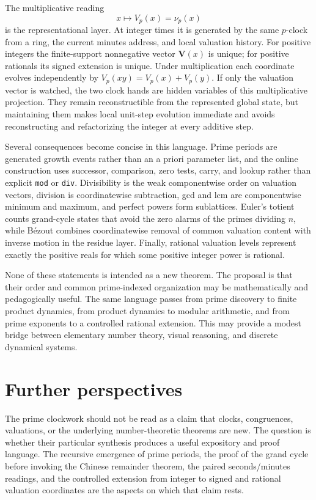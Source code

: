 \documentclass[11pt,a4paper]{article}
\theoremstyle{clockplain}
\theoremstyle{definition}
\theoremstyle{remark}
\newcommand{\V}{\mathbf V}
\begin{document}
The multiplicative reading
\[
x\longmapsto V_p(x)=\nu_p(x)
\]
is the representational layer. At integer times it is generated by the same $p$-clock from a ring, the current minutes address, and local valuation history. For positive integers the finite-support nonnegative vector $\V(x)$ is unique; for positive rationals its signed extension is unique. Under multiplication each coordinate evolves independently by $V_p(xy)=V_p(x)+V_p(y)$. If only the valuation vector is watched, the two clock hands are hidden variables of this multiplicative projection. They remain reconstructible from the represented global state, but maintaining them makes local unit-step evolution immediate and avoids reconstructing and refactorizing the integer at every additive step.

Several consequences become concise in this language. Prime periods are generated growth events rather than an a priori parameter list, and the online construction uses successor, comparison, zero tests, carry, and lookup rather than explicit \texttt{mod} or \texttt{div}. Divisibility is the weak componentwise order on valuation vectors, division is coordinatewise subtraction, gcd and lcm are componentwise minimum and maximum, and perfect powers form sublattices. Euler's totient counts grand-cycle states that avoid the zero alarms of the primes dividing $n$, while B\'ezout combines coordinatewise removal of common valuation content with inverse motion in the residue layer. Finally, rational valuation levels represent exactly the positive reals for which some positive integer power is rational.

None of these statements is intended as a new theorem. The proposal is that their order and common prime-indexed organization may be mathematically and pedagogically useful. The same language passes from prime discovery to finite product dynamics, from product dynamics to modular arithmetic, and from prime exponents to a controlled rational extension. This may provide a modest bridge between elementary number theory, visual reasoning, and discrete dynamical systems.

\section{Further perspectives}

The prime clockwork should not be read as a claim that clocks, congruences, valuations, or the underlying number-theoretic theorems are new. The question is whether their particular synthesis produces a useful expository and proof language. The recursive emergence of prime periods, the proof of the grand cycle before invoking the Chinese remainder theorem, the paired seconds/minutes readings, and the controlled extension from integer to signed and rational valuation coordinates are the aspects on which that claim rests.
\end{document}
